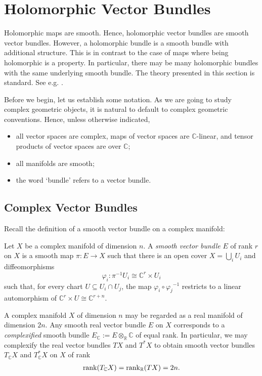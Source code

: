 \documentclass[12pt]{ociamthesis}  %
\begin{document}
\section{Holomorphic Vector Bundles}

Holomorphic maps are smooth. Hence, holomorphic vector bundles
are smooth vector bundles. However, a holomorphic bundle is a 
smooth bundle with additional structure. This is in contrast to
the case of maps where being holomorphic is a property. In particular,
there may be many holomorphic bundles with
the same underlying smooth bundle. The theory presented
in this section is standard. See e.g. \cite{moroianu2004}.

Before we begin, let us establish some notation. As we are going to study
complex geometric objects, it is natural to default to complex
geometric conventions. Hence, unless otherwise indicated,
\begin{itemize}
  \item all vector spaces are complex, maps of vector spaces are
        $\mathbb{C}$-linear, and tensor products of vector spaces are
        over $\mathbb{C}$;
  \item all manifolds are smooth;
  \item the word `bundle' refers to a vector bundle.
\end{itemize}

\subsection{Complex Vector Bundles}

Recall the definition of a smooth vector bundle on a complex manifold:

\begin{definition}\label{def:complex_bundle}
  Let $X$ be a complex manifold of dimension $n$. A
  \emph{smooth vector bundle} $E$ of rank $r$ on $X$ is a smooth map
  $\pi : E\to X$ such that there
  is an open cover $X = \bigcup_i U_i$ and diffeomorphisms
  \begin{equation}\label{eq:smooth_trivialisation}
    \varphi_i : {\pi}^{-1}U_i \cong \mathbb{C}^r \times U_i
  \end{equation}
  such that, for every chart $U\subseteq U_i\cap U_j$, the
  map $\varphi_i \circ {\varphi_j}^{-1}$ restricts to a linear
  automorphism of $\mathbb{C}^r\times U \cong \mathbb{C}^{r+n}$.
\end{definition}

\begin{example}
  A complex manifold $X$ of dimension $n$ may be regarded as a
  real manifold of dimension $2n$. Any smooth real vector bundle
  $E$ on $X$ corresponds to a \emph{complexified} smooth bundle
  $E_{\mathbb{C}} := E\otimes_{\mathbb{R}} \mathbb{C}$ of equal rank.
  In particular, we may complexify the real vector bundles
  $TX$ and $T^*X$ to obtain smooth vector bundles
  $T_{\mathbb{C}} X$ and $T_{\mathbb{C}}^*X$
  on $X$ of rank
  \begin{align*}
    \operatorname{rank}(T_\mathbb{C} X)
    = \operatorname{rank}_{\mathbb{R}} (TX) = 2n.
  \end{align*}
\end{example}
\end{document}
